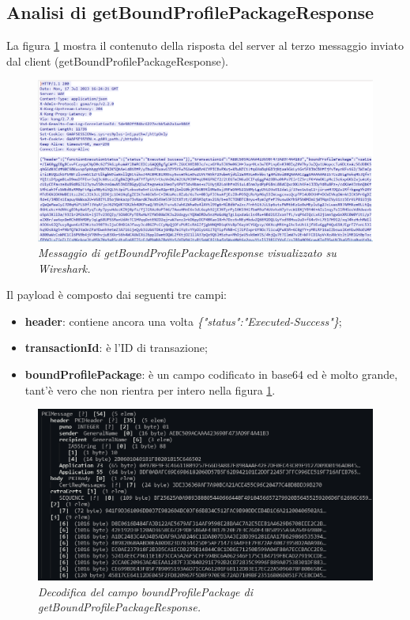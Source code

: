\documentclass[10pt, oneside]{book}
\begin{document}
\subsection{Analisi di getBoundProfilePackageResponse}
La figura \ref{fig:msg6-stream-pcap} mostra il contenuto della risposta del server al terzo messaggio inviato dal client (getBoundProfilePackageResponse).\\
\begin{figure}
\includegraphics[width=\linewidth]{msg6-stream-pcap.png}
\caption{\textit{Messaggio di getBoundProfilePackageResponse visualizzato su Wireshark.}}
\label{fig:msg6-stream-pcap}
\end{figure}
Il payload è composto dai seguenti tre campi:
\begin{itemize}
\item \textbf{header}: contiene ancora una volta \textit{\{"status":"Executed-Success"\}};
\item \textbf{transactionId}: è l'ID di transazione;
\item \textbf{boundProfilePackage}: è un campo codificato in base64 ed è molto grande, tant'è vero che non rientra per intero nella figura \ref{fig:msg6-stream-pcap}.
\end{itemize}
\begin{figure}
\includegraphics[width=\linewidth]{decode-boundProfilePackage.png}
\caption{\textit{Decodifica del campo boundProfilePackage di getBoundProfilePackageResponse.}}
\label{fig:decode-boundProfilePackage}
\end{figure}
\end{document}
